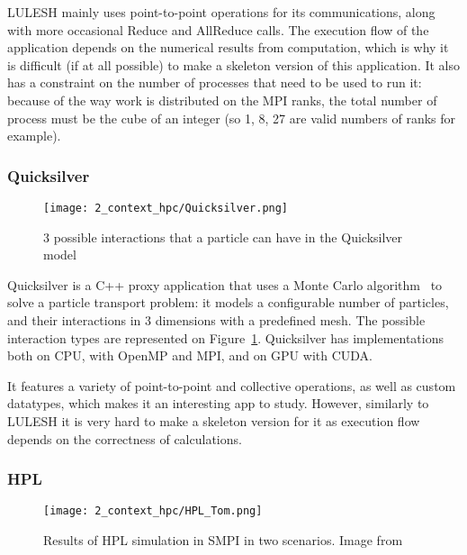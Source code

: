 LULESH mainly uses point-to-point operations for its communications, along with
more occasional Reduce and AllReduce calls. The execution flow of the
application depends on the numerical results from computation, which is why it
is difficult (if at all possible) to make a skeleton version of this
application. It also has a constraint on the number of processes that need to be
used to run it: because of the way work is distributed on the MPI ranks, the
total number of process must be the cube of an integer (so 1, 8, 27 are valid
numbers of ranks for example).

\subsubsection{Quicksilver}

\begin{figure}[!ht]
    \centering
    \texttt{[image: 2\_context\_hpc/Quicksilver.png]}
    \caption[3 possible interactions that a particle can have in the Quicksilver model]{3 possible interactions that a particle can have in the Quicksilver model\protect\footnotemark}
    \label{fig:2_context_hpc:Quicksilver}
\end{figure}


Quicksilver is a C++ proxy application that uses a Monte Carlo
algorithm~\cite{Carter1975} to solve a particle transport problem: it models a
configurable number of particles, and their interactions in 3 dimensions with a
predefined mesh. The possible interaction types are represented on
Figure~\ref{fig:2_context_hpc:Quicksilver}. Quicksilver has implementations both
on CPU, with OpenMP and MPI, and on GPU with CUDA.

It features a variety of point-to-point and collective operations, as well as
custom datatypes, which makes it an interesting app to study. However, similarly
to LULESH it is very hard to make a skeleton version for it as execution flow
depends on the correctness of calculations.

\subsubsection{HPL}

\begin{figure}[!ht]
    \centering
    \texttt{[image: 2\_context\_hpc/HPL\_Tom.png]}
    \caption[Results of HPL simulation in SMPI in two scenarios]{Results of HPL
    simulation in SMPI in two scenarios. Image from~\cite{Cornebize2021}}
    \label{fig:2_context_hpc:HPL_Tom}
\end{figure}

